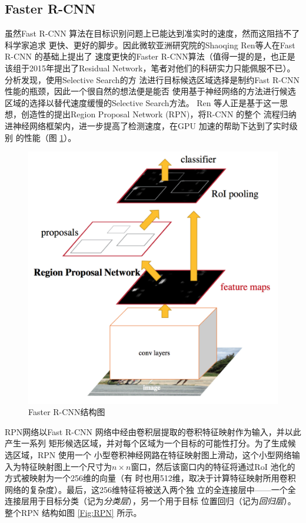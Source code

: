 \subsection{Faster R-CNN}

虽然Fast R-CNN 算法在目标识别问题上已能达到准实时的速度，然而这阻挡不了科学家追求
更快、更好的脚步。因此微软亚洲研究院的Shaoqing Ren等人在Fast R-CNN 的基础上提出了
速度更快的Faster R-CNN算法\cite{Ren:2015ug}（值得一提的是，也正是该组于2015年提出了Residual
Network，笔者对他们的科研实力只能佩服不已）。分析发现，使用Selective Search的方
法进行目标候选区域选择是制约Fast R-CNN 性能的瓶颈，因此一个很自然的想法便是能否
使用基于神经网络的方法进行候选区域的选择以替代速度缓慢的Selective Search方法。
Ren 等人正是基于这一思想，创造性的提出Region Proposal Network (RPN)，将R-CNN 的整个
流程归纳进神经网络框架内，进一步提高了检测速度，在GPU 加速的帮助下达到了实时级别
的性能（图 \ref{Fig:FasterRCNN}）。

\begin{figure}[ht]
  \centering
  \includegraphics[height=0.4\textheight, keepaspectratio]{./Figure/FasterRCNN.png}
  \caption{Faster R-CNN结构图\cite{Ren:2015ug}}\label{Fig:FasterRCNN}
\end{figure}

RPN网络以Fast R-CNN 网络中经由卷积层提取的卷积特征映射作为输入，并以此产生一系列
矩形候选区域，并对每个区域为一个目标的可能性打分。为了生成候选区域，RPN 使用一个
小型卷积神经网路在特征映射图上滑动，这个小型网络输入为特征映射图上一个尺寸为$n
\times n$窗口，然后该窗口内的特征将通过RoI 池化的方式被映射为一个256维的向量（有
时也用512维，取决于计算特征映射所用卷积网络的复杂度）。最后，这256维特征将被送入两个独
立的全连接层中——一个全连接层用于目标分类（记为\textit{分类层}），另一个用于目标
位置回归（记为\textit{回归层}）。整个RPN 结构如图 \ref{Fig:RPN} 所示。

